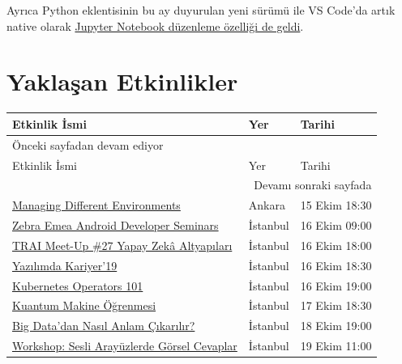 \documentclass[11pt]{article}
\begin{document}
Ayrıca Python eklentisinin bu ay duyurulan yeni sürümü ile VS Code'da artık
native olarak \href{https://devblogs.microsoft.com/python/announcing-support-for-native-editing-of-jupyter-notebooks-in-vs-code/}{Jupyter Notebook düzenleme özelliği de geldi}.
\newpage
\section{Yaklaşan Etkinlikler}
\label{sec:orga3714cf}
\begin{longtable}{|p{8cm}|l|l|}
\hline
Etkinlik İsmi & Yer & Tarihi\\
\hline
\endfirsthead
\multicolumn{3}{l}{Önceki sayfadan devam ediyor} \\
\hline

Etkinlik İsmi & Yer & Tarihi \\

\hline
\endhead
\hline\multicolumn{3}{r}{Devamı sonraki sayfada} \\
\endfoot
\endlastfoot
\hline
\href{https://kommunity.com/nsankara/events/ns-ankara-ekim-ayi-2-bulusma}{Managing Different Environments} & Ankara & 15 Ekim 18:30\\
\href{https://www.eventbrite.com/e/zebra-emea-android-developer-seminars-istanbul-2019-tickets-73787116251}{Zebra Emea Android Developer Seminars} & İstanbul & 16 Ekim 09:00\\
\href{https://www.eventbrite.com/e/trai-meet-up-27-yapay-zeka-altyaplar-tickets-73255123045}{TRAI Meet-Up \#27 Yapay Zekâ Altyapıları} & İstanbul & 16 Ekim 18:00\\
\href{https://www.eventbrite.com/e/yazlmda-kariyer19-tickets-75927901397}{Yazılımda Kariyer'19} & İstanbul & 16 Ekim 18:30\\
\href{https://kommunity.com/software-craftsmanship-turkey/events/kubernetes-operators-101}{Kubernetes Operators 101} & İstanbul & 16 Ekim 19:00\\
\href{https://www.eventbrite.com/e/kuantum-makine-ogrenmesi-tickets-76530519845}{Kuantum Makine Öğrenmesi} & İstanbul & 17 Ekim 18:30\\
\href{https://kommunity.com/devnot-yazilimci-bulusmalari/events/big-datadan-nasil-anlam-cikarabiliriz}{Big Data'dan Nasıl Anlam Çıkarılır?} & İstanbul & 18 Ekim 19:00\\
\href{https://kommunity.com/voistanbul/events/workshop-sesli-arayuzlerde-gorsel-cevaplar}{Workshop: Sesli Arayüzlerde Görsel Cevaplar} & İstanbul & 19 Ekim 11:00\\
\hline
\end{longtable}
\end{document}
